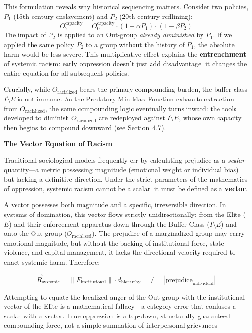 \documentclass[12pt]{article}
\begin{document}
This formulation reveals why historical sequencing matters. Consider two policies, $P_1$ (15th century enslavement) and $P_2$ (20th century redlining):
\[
O_2^{\text{capacity}} = O_0^{\text{capacity}} \cdot (1 - \alpha P_1) \cdot (1 - \beta P_2)
\]
The impact of $P_2$ is applied to an Out-group \textit{already diminished} by $P_1$. If we applied the same policy $P_2$ to a group without the history of $P_1$, the absolute harm would be less severe. This multiplicative effect explains the \textbf{entrenchment} of systemic racism: early oppression doesn't just add disadvantage; it changes the entire equation for all subsequent policies.

Crucially, while $O_{\text{racialized}}$ bears the primary compounding burden, the buffer class $I \setminus E$ is not immune. As the Predatory Min-Max Function exhausts extraction from $O_{\text{racialized}}$, the same compounding logic eventually turns inward: the tools developed to diminish $O_{\text{racialized}}$ are redeployed against $I \setminus E$, whose own capacity then begins to compound downward (see Section~4.7).

\textbf{The Vector Equation of Racism}

Traditional sociological models frequently err by calculating prejudice as a \textit{scalar} quantity---a metric possessing magnitude (emotional weight or individual bias) but lacking a definitive direction. Under the strict parameters of the mathematics of oppression, systemic racism cannot be a scalar; it must be defined as a \textbf{vector}.

A vector possesses both magnitude and a specific, irreversible direction. In systems of domination, this vector flows strictly unidirectionally: from the Elite ($E$) and their enforcement apparatus down through the Buffer Class ($I \setminus E$) and onto the Out-group ($O_{\text{racialized}}$). The prejudice of a marginalized group may carry emotional magnitude, but without the backing of institutional force, state violence, and capital management, it lacks the directional velocity required to enact systemic harm. Therefore:

\[
\vec{R}_{\text{systemic}} = \left\| F_{\text{institutional}} \right\| \cdot \hat{d}_{\text{hierarchy}} \quad \neq \quad \left| \text{prejudice}_{\text{individual}} \right|
\]

Attempting to equate the localized anger of the Out-group with the institutional vector of the Elite is a mathematical fallacy---a category error that confuses a scalar with a vector. True oppression is a top-down, structurally guaranteed compounding force, not a simple summation of interpersonal grievances.
\end{document}
